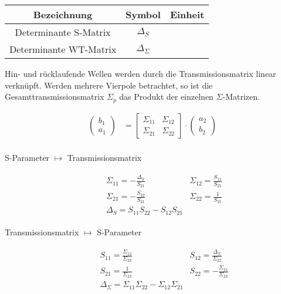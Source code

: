 \begin{center}
\begin{tabular}{ccc} \toprule
Bezeichnung & Symbol & Einheit \\ \midrule
Determinante S-Matrix & $\Delta_S$ &  \\
Determinante WT-Matrix & $\Delta_\Sigma$ &  \\
\bottomrule
\end{tabular}
\end{center}
Hin- und rücklaufende Wellen werden durch die Transmissionsmatrix linear verknüpft. Werden mehrere Vierpole betrachtet, so ist die Gesamttransmissionsmatrix $\Sigma_p$ das Produkt der einzelnen $\Sigma$-Matrizen.
\begin{center}
\begin{tikzpicture}[scale=0.3, every node/.style={scale=0.8}]

\end{tikzpicture}
\end{center}
\begin{align*}
\left( \begin{array}{c}
b_1 \\ 
a_1
\end{array} \right) &= \left[
\begin{array}{cc}
\Sigma_{11} & \Sigma_{12} \\ 
\Sigma_{21} & \Sigma_{22}
\end{array} \right] \cdot
\left( \begin{array}{c}
a_2 \\ 
b_2
\end{array} \right) \\
\end{align*}

\begin{description}
\item[S-Parameter $\longmapsto$ Transmissionsmatrix]
\renewcommand{\arraystretch}{1.6}
\begin{align*}
\begin{array}{cc}
\Sigma_{11} = - \frac{\Delta_S}{S_{21}} & \Sigma_{12} = \frac{S_{11}}{S_{21}} \\ 
\Sigma_{21} = - \frac{S_{22}}{S_{21}} & \Sigma_{22} = \frac{1}{S_{21}} \\
\Delta_S = S_{11}S_{22} - S_{12}S_{21} &
\end{array}
\end{align*}

\item[Transmissionsmatrix $\longmapsto$ S-Parameter]
\begin{align*}
\begin{array}{cc}
S_{11} = \frac{\Sigma_{12}}{\Sigma_{22}} & S_{12} = \frac{\Delta_\Sigma}{\Sigma_{22}} \\
S_{21} = \frac{1}{\Sigma_{22}} & S_{22} = - \frac{\Sigma_{21}}{\Sigma_{22}} \\
\Delta_\Sigma = \Sigma_{11}\Sigma_{22} - \Sigma_{12}\Sigma_{21} &
\end{array}
\end{align*}
\renewcommand{\arraystretch}{1}
\end{description}